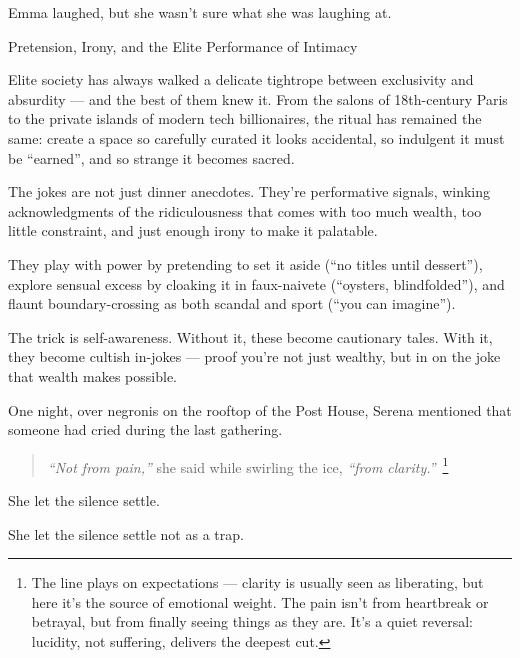 Emma laughed, but she wasn’t sure what she was laughing at.

\medskip

\begin{HistoricalSidebar}{Pretension, Irony, and the Elite Performance of Intimacy}

  Elite society has always walked a delicate tightrope between exclusivity and absurdity — and the best 
  of them knew it. From the salons of 18th-century Paris to the private islands of modern tech 
  billionaires, the ritual has remained the same: create a space so carefully curated it looks 
  accidental, so indulgent it must be ``earned'', and so strange it becomes sacred.

  \medskip
  
  The jokes are not just dinner anecdotes. They’re performative signals, winking acknowledgments of the 
  ridiculousness that comes with too much wealth, too little constraint, and just enough irony to 
  make it palatable.

  \medskip
  
  They play with power by pretending to set it aside (“no titles until dessert”), explore sensual 
  excess by cloaking it in faux-naivete (“oysters, blindfolded”), and flaunt boundary-crossing as 
  both scandal and sport (“you can imagine”). 

  \medskip
  
  The trick is self-awareness. Without it, these become cautionary tales. With it, they become 
  cultish in-jokes — proof you’re not just wealthy, but in on the joke that wealth makes possible.
  
\end{HistoricalSidebar}


One night, over negronis on the rooftop of the Post House, Serena mentioned that someone had cried during the 
last gathering.  

\begin{quote}
\textit{“Not from pain,”} she said while swirling the ice, \textit{“from clarity.”}\ \footnote{The line plays on 
expectations — clarity is usually seen as liberating, but here it’s the source of emotional weight. The pain 
isn't from heartbreak or betrayal, but from finally seeing things as they are. It's a quiet reversal: lucidity, 
not suffering, delivers the deepest cut.}
\end{quote}

She let the silence settle. 

She let the silence settle not as a trap.  

